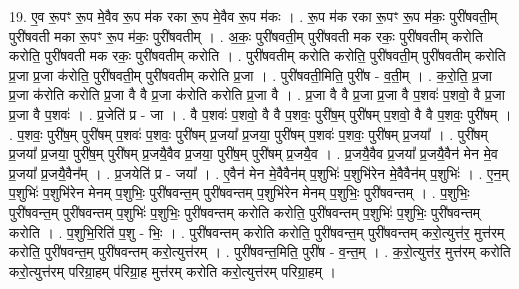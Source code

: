\documentclass[17pt]{extarticle}
\begin{document}
19. ए॒व रू॒पꣳ रू॒प मे॒वैव रू॒प म॑क रका रू॒प मे॒वैव रू॒प म॑कः । . रू॒प म॑क रका रू॒पꣳ रू॒प म॑कः॒ पुरी॑षवती॒म् पुरी॑षवती मका रू॒पꣳ रू॒प म॑कः॒ पुरी॑षवतीम् । . अ॒कः॒ पुरी॑षवती॒म् पुरी॑षवती मक रकः॒ पुरी॑षवतीम् करोति करोति॒ पुरी॑षवती मक रकः॒ पुरी॑षवतीम् करोति । . पुरी॑षवतीम् करोति करोति॒ पुरी॑षवती॒म् पुरी॑षवतीम् करोति प्र॒जा प्र॒जा क॑रोति॒ पुरी॑षवती॒म् पुरी॑षवतीम् करोति प्र॒जा । . पुरी॑षवती॒मिति॒ पुरी॑ष - व॒ती॒म् । . क॒रो॒ति॒ प्र॒जा प्र॒जा क॑रोति करोति प्र॒जा वै वै प्र॒जा क॑रोति करोति प्र॒जा वै । . प्र॒जा वै वै प्र॒जा प्र॒जा वै प॒शवः॑ प॒शवो॒ वै प्र॒जा प्र॒जा वै प॒शवः॑ । . प्र॒जेति॑ प्र - जा । . वै प॒शवः॑ प॒शवो॒ वै वै प॒शवः॒ पुरी॑ष॒म् पुरी॑षम् प॒शवो॒ वै वै प॒शवः॒ पुरी॑षम् । . प॒शवः॒ पुरी॑ष॒म् पुरी॑षम् प॒शवः॑ प॒शवः॒ पुरी॑षम् प्र॒जया᳚ प्र॒जया॒ पुरी॑षम् प॒शवः॑ प॒शवः॒ पुरी॑षम् प्र॒जया᳚ । . पुरी॑षम् प्र॒जया᳚ प्र॒जया॒ पुरी॑ष॒म् पुरी॑षम् प्र॒जयै॒वैव प्र॒जया॒ पुरी॑ष॒म् पुरी॑षम् प्र॒जयै॒व । . प्र॒जयै॒वैव प्र॒जया᳚ प्र॒जयै॒वैन॑ मेन मे॒व प्र॒जया᳚ प्र॒जयै॒वैन᳚म् । . प्र॒जयेति॑ प्र - जया᳚ । . ए॒वैन॑ मेन मे॒वैवैन॑म् प॒शुभिः॑ प॒शुभि॑रेन मे॒वैवैन॑म् प॒शुभिः॑ । . ए॒न॒म् प॒शुभिः॑ प॒शुभि॑रेन मेनम् प॒शुभिः॒ पुरी॑षवन्त॒म् पुरी॑षवन्तम् प॒शुभि॑रेन मेनम् प॒शुभिः॒ पुरी॑षवन्तम् । . प॒शुभिः॒ पुरी॑षवन्त॒म् पुरी॑षवन्तम् प॒शुभिः॑ प॒शुभिः॒ पुरी॑षवन्तम् करोति करोति॒ पुरी॑षवन्तम् प॒शुभिः॑ प॒शुभिः॒ पुरी॑षवन्तम् करोति । . प॒शुभि॒रिति॑ प॒शु - भिः॒ । . पुरी॑षवन्तम् करोति करोति॒ पुरी॑षवन्त॒म् पुरी॑षवन्तम् करो॒त्युत्त॑र॒ मुत्त॑रम् करोति॒ पुरी॑षवन्त॒म् पुरी॑षवन्तम् करो॒त्युत्त॑रम् । . पुरी॑षवन्त॒मिति॒ पुरी॑ष - व॒न्त॒म् । . क॒रो॒त्युत्त॑र॒ मुत्त॑रम् करोति करो॒त्युत्त॑रम् परिग्रा॒हम् प॑रिग्रा॒ह मुत्त॑रम् करोति करो॒त्युत्त॑रम् परिग्रा॒हम् । \newline
\end{document}
